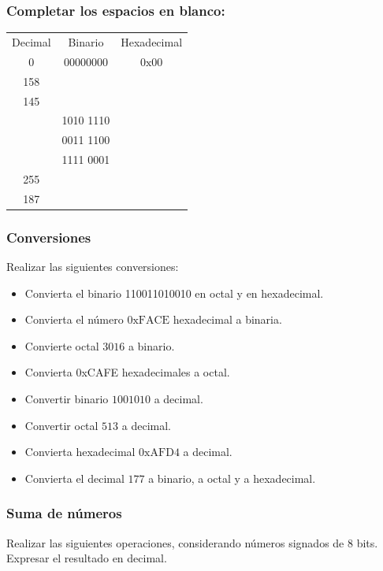\begin{ejercicioClase}
    \subsubsection{Completar los espacios en blanco:}
    \begin{tabular}{ccc}
      Decimal&Binario&Hexadecimal\\
      0&00000000&$\mathrm{0x00}$ \\
      158& &\underspace\\
      145&\underspace &\underspace \\
      \underspace&1010 1110&\underspace \\
      \underspace&0011 1100&\underspace \\
      \underspace&1111 0001&\underspace \\
      255& &\underspace\\
      187&\underspace &\underspace \\
    \end{tabular}

    \subsubsection{Conversiones}
    Realizar las siguientes conversiones:
    \begin{itemize}
      \item Convierta el binario 110011010010 en octal y en hexadecimal.
      \item Convierta el número $\mathrm{0xFACE}$ hexadecimal a binaria.
      \item Convierte octal $\mathrm{3016}$ a binario.
      \item Convierta 0xCAFE hexadecimales a octal.
      \item Convertir binario $\mathrm{1001010}$ a decimal.
      \item Convertir octal $\mathrm{513}$ a decimal.
      \item Convierta hexadecimal $\mathrm{0xAFD4}$ a decimal.
      \item Convierta el decimal $\mathrm{177}$ a binario, a octal y a hexadecimal.
    \end{itemize}
    

    \subsubsection{Suma de números}
    Realizar las siguientes operaciones, considerando números signados de 8 bits. Expresar el resultado en decimal.
    \vspace{10mm}
    

\end{ejercicioClase}

